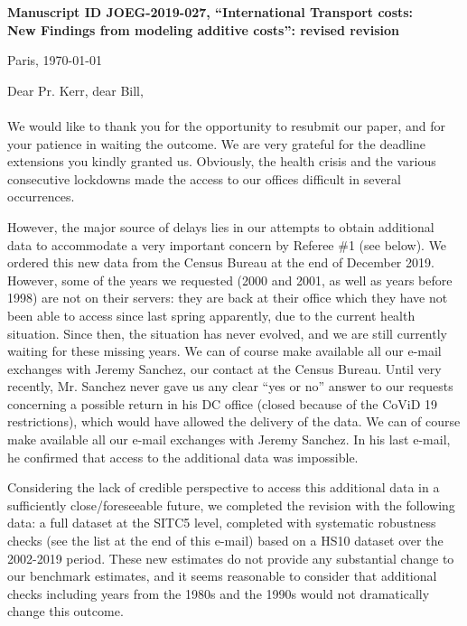 \documentclass[12pt]{article}
\begin{document}
\noindent \textbf{Manuscript ID JOEG-2019-027, ``International Transport costs:\\New Findings from modeling additive costs'': revised revision}

\bigskip
\bigskip

\hfill Paris, \today

\bigskip
\noindent Dear Pr. Kerr, dear Bill, \\
\\
\noindent \noindent We would like to thank you for the opportunity to resubmit our paper, and for your patience in waiting the outcome. We are very grateful for the deadline extensions you kindly granted us. Obviously, the health crisis and the various consecutive lockdowns made the access to our offices difficult in several occurrences. \medskip

However, the major source of delays lies in our attempts to obtain additional data to accommodate a very important concern by Referee \#1 (see below). We ordered this new data from the Census Bureau at the end of December 2019. However, some of the years we requested (2000 and 2001, as well as years before 1998) are not on their servers: they are back at their office which they have not been able to access since last spring apparently, due to the current health situation. Since then, the situation has never evolved, and we are still currently waiting for these missing years. We can of course make available all our e-mail exchanges with Jeremy Sanchez, our contact at the Census Bureau. Until very recently, Mr. Sanchez never gave us any clear “yes or no” answer to our requests concerning a possible return in his DC office (closed because of the CoViD 19 restrictions), which would have allowed the delivery of the data. We can of course make available all our e-mail exchanges with Jeremy Sanchez. In his last e-mail, he confirmed that access to the additional data was impossible.\medskip

Considering the lack of credible perspective to access this additional data in a sufficiently close/foreseeable future, we completed the revision with the following data: a full dataset at the SITC5 level, completed with systematic robustness checks (see the list at the end of this e-mail) based on a HS10 dataset over the 2002-2019 period. These new estimates do not provide any substantial change to our benchmark estimates, and it seems reasonable to consider that additional checks including years from the 1980s and the 1990s would not dramatically change this outcome. \medskip
\end{document}

